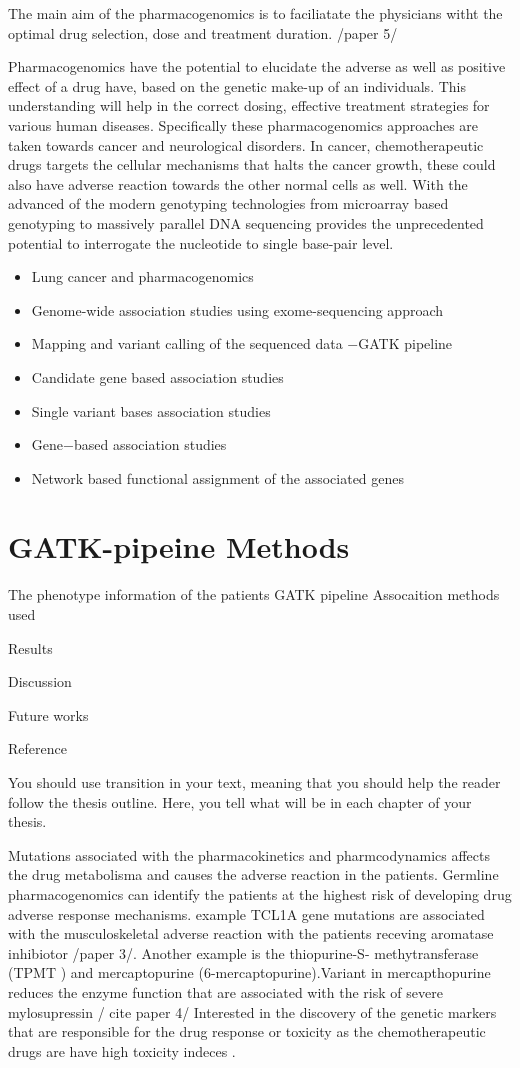 The main aim of the pharmacogenomics is to faciliatate the physicians witht the optimal drug selection, dose and treatment duration. /paper 5/

Pharmacogenomics have the potential to elucidate the adverse as well as positive effect of a drug have, based on the genetic make-up of an individuals. This understanding will help in the correct dosing, effective treatment strategies for various human diseases. Specifically these pharmacogenomics approaches are taken towards cancer and neurological disorders. In cancer, chemotherapeutic drugs targets the cellular mechanisms that halts the cancer growth, these could also have adverse reaction towards the other normal cells as well. With the advanced of the modern genotyping technologies from microarray based genotyping to massively parallel DNA sequencing provides the unprecedented potential to interrogate the nucleotide to single base-pair level.

\begin{itemize}
\item Lung cancer and pharmacogenomics
\item Genome-wide association studies using exome-sequencing approach
\item Mapping and variant calling of the sequenced data $-$GATK pipeline
\item Candidate gene based association studies
\item Single variant bases association studies
\item Gene$-$based association studies
\item Network based functional assignment of the associated genes
\end{itemize}


\section{GATK-pipeine Methods}
The phenotype information of the patients
GATK pipeline 
Assocaition methods used

Results

Discussion

Future works 

Reference


You should use transition in your text, meaning that you should help
the reader follow the thesis outline. Here, you tell what will be in
each chapter of your thesis. 

Mutations associated with the pharmacokinetics and pharmcodynamics affects the drug metabolisma and causes the adverse reaction in the patients. Germline pharmacogenomics can identify the patients at the highest risk of developing drug adverse response mechanisms. example TCL1A gene mutations are associated with the musculoskeletal adverse reaction with the patients receving aromatase inhibiotor /paper 3/.
 Another example is the thiopurine-S- methytransferase (TPMT ) and mercaptopurine (6-mercaptopurine).Variant in mercapthopurine reduces the enzyme function that are associated with the risk of severe mylosupressin / cite paper 4/
 Interested in the discovery of the genetic markers that are responsible for the drug response or toxicity as the chemotherapeutic drugs are have high toxicity indeces .  

